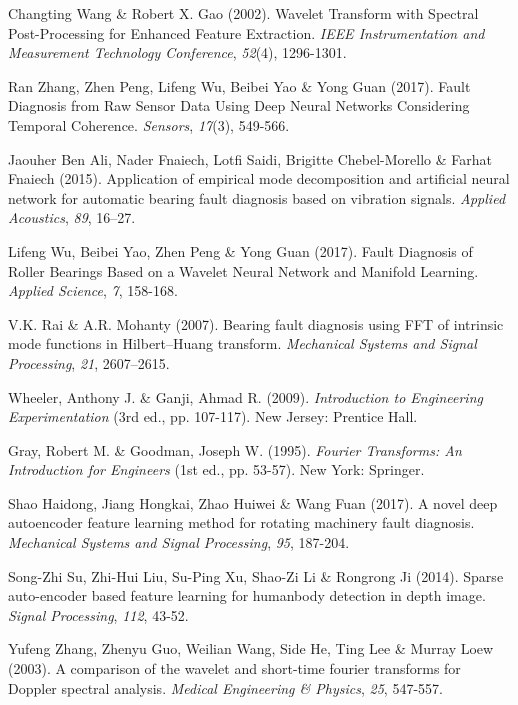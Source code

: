 \documentclass[12pt]{article}%
\begin{document}
\begin{thebibliography}{9}
 Changting Wang \& Robert X. Gao (2002). Wavelet Transform with Spectral Post-Processing for
Enhanced Feature Extraction. \textit{IEEE Instrumentation and Measurement Technology Conference}, \textit{52}(4), 1296-1301.

 Ran Zhang, Zhen Peng, Lifeng Wu, Beibei Yao \& Yong Guan (2017). Fault Diagnosis from Raw Sensor Data Using Deep Neural Networks Considering Temporal Coherence. \textit{Sensors}, \textit{17}(3), 549-566.

 Jaouher Ben Ali, Nader Fnaiech, Lotfi Saidi, Brigitte Chebel-Morello \& Farhat Fnaiech (2015). Application of empirical mode decomposition and artificial neural network for automatic bearing fault diagnosis based on vibration signals. \textit{Applied Acoustics}, \textit{89}, 16–27.

 Lifeng Wu, Beibei Yao, Zhen Peng \& Yong Guan (2017). Fault Diagnosis of Roller Bearings Based on a Wavelet Neural Network and Manifold Learning. \textit{Applied Science}, \textit{7}, 158-168. 

 V.K. Rai \& A.R. Mohanty (2007). Bearing fault diagnosis using FFT of intrinsic mode functions in Hilbert–Huang transform. \textit{Mechanical Systems and Signal Processing}, \textit{21}, 2607–2615.

 Wheeler, Anthony J. \& Ganji, Ahmad R. (2009). \textit{Introduction to Engineering Experimentation} (3rd ed., pp. 107-117). New Jersey: Prentice Hall.

 Gray, Robert M. \& Goodman, Joseph W. (1995). \textit{Fourier Transforms: An Introduction for Engineers} (1st ed., pp. 53-57). New York: Springer.

 Shao Haidong, Jiang Hongkai, Zhao Huiwei \& Wang Fuan (2017). A novel deep autoencoder feature learning method for rotating machinery fault diagnosis. \textit{Mechanical Systems and Signal Processing}, \textit{95}, 187-204. 

 Song-Zhi Su, Zhi-Hui Liu, Su-Ping Xu, Shao-Zi Li \& Rongrong Ji (2014). Sparse auto-encoder based feature learning for humanbody detection in depth image. \textit{Signal Processing}, \textit{112}, 43-52.

 Yufeng Zhang, Zhenyu Guo, Weilian Wang, Side He, Ting Lee \& Murray Loew (2003). A comparison of the wavelet and short-time fourier transforms for Doppler spectral analysis. \textit{Medical Engineering \& Physics}, \textit{25}, 547-557.


\end{thebibliography}
\end{document}
